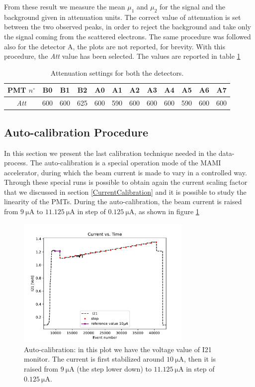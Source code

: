 From these result we measure the mean $\mu_{1}$ and $\mu_{2}$ for the signal and the background given in attenuation units. The correct value of attenuation is set between the two observed peaks, in order to reject the background and take only the signal coming from the scattered electrons. The same procedure was followed also for the detector A, the plots are not reported, for brevity.
With this procedure, the \textit{Att} value has been selected. The values are reported in table \ref{tab:AttSettings}

\begin{table}[ht]
\centering
\begin{tabular}{cccccccccccc}
PMT $n^{\circ}$& B0 & B1 & B2 & A0 & A1 & A2 & A3 & A4 & A5 & A6 & A7 \\
\hline
\textit{Att} & 600 & 600 & 625 & 600 & 590 & 600 & 600 & 600 & 590 & 600 & 600 \\
\end{tabular}
\caption{Attenuation settings for both the detectors.}
\label{tab:AttSettings}
\end{table}


\subsection{Auto-calibration Procedure} \label{Autocalib}

In this section we present the last calibration technique needed in the data-process. The auto-calibration is a special operation mode of the MAMI accelerator, during which the beam current is made to vary in a controlled way. Through these special runs is possible to obtain again the current scaling factor that we discussed in section \ref{CurrentCalibration} and  it is possible to study the linearity of the PMTs. During the auto-calibration, the beam current is raised from $\SI{9}{\micro \ampere}$ to $\SI{11.125}{\micro \ampere}$ in step of $\SI{0.125}{\micro \ampere}$, as shown in figure \ref{fig:Autocalibration}

\begin{figure}[!ht]
\centering
\includegraphics[width = 0.75\textwidth]{Analysis/Autocalib/Current.pdf}
\caption{Auto-calibration: in this plot we have the voltage value of I21 monitor. The current is first stabilized around $\SI{10}{\micro \ampere}$, then it is raised from $\SI{9}{\micro \ampere}$ (the step lower down) to $\SI{11.125}{\micro \ampere}$ in step of $\SI{0.125}{\micro \ampere}$.}
\label{fig:Autocalibration}
\end{figure}

